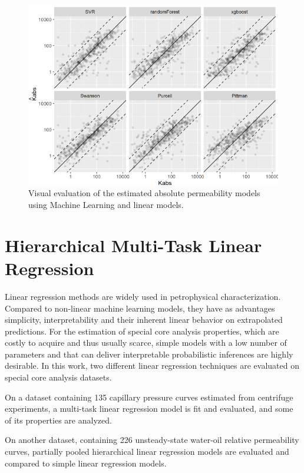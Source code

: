 \documentclass[english,msc,numbers]{coppe}
\begin{document}
  \begin{figure}[t]
  
  {\centering \includegraphics[width=0.9\linewidth]{figure/3-13-cross-validation-models} 
  
  }
  
  \caption{Visual evaluation of the estimated absolute permeability models using Machine Learning and linear models.}\label{fig:cross-validation-models}
  \end{figure}
  \hypertarget{hierarchical-linear-regression}{%
  \chapter{Hierarchical Multi-Task Linear Regression}\label{hierarchical-linear-regression}}
  
  Linear regression methods are widely used in petrophysical characterization. Compared to non-linear machine learning models, they have as advantages simplicity, interpretability and their inherent linear behavior on extrapolated predictions. For the estimation of special core analysis properties, which are costly to acquire and thus usually scarce, simple models with a low number of parameters and that can deliver interpretable probabilistic inferences are highly desirable. In this work, two different linear regression techniques are evaluated on special core analysis datasets.
  
  On a dataset containing 135 capillary pressure curves estimated from centrifuge experiments, a multi-task linear regression model is fit and evaluated, and some of its properties are analyzed.
  
  On another dataset, containing 226 unsteady-state water-oil relative permeability curves, partially pooled hierarchical linear regression models are evaluated and compared to simple linear regression models.
  
\end{document}
